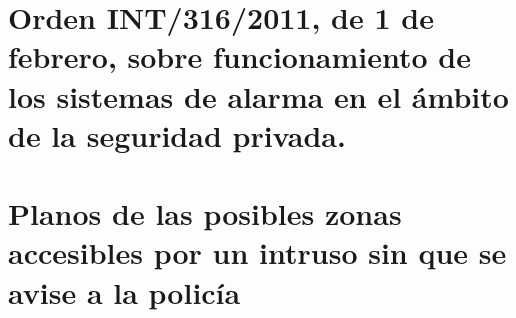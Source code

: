 \appendix

\chapter[Orden INT/316/2011 sobre seguridad privada]{Orden INT/316/2011, de 1 de febrero, sobre funcionamiento de los sistemas de alarma en el ámbito de la seguridad privada.}
\label{cap:reglamento_seguridad}


\chapter[Planos de zonas no seguras]{Planos de las posibles zonas accesibles por un intruso sin que se avise a la policía}
%
%
